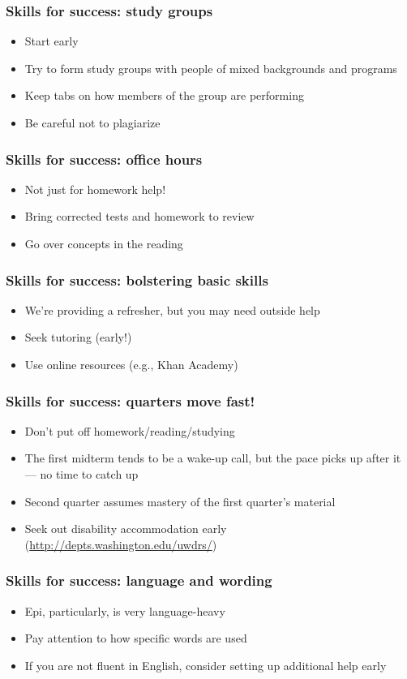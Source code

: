 \documentclass[12pt]{beamer}
\newcommand{\myframe}[1]{\begin{frame} \frametitle{#1}}
\newenvironment{spaceitemize}
{ \begin{itemize}
    \setlength{\itemsep}{10pt}
    \setlength{\parskip}{0pt}
    \setlength{\parsep}{0pt}     }
{ \end{itemize}                  }
\begin{document}
\myframe{Skills for success: study groups}
\begin{spaceitemize}
\item Start early
\item Try to form study groups with people of mixed backgrounds and programs
\item Keep tabs on how members of the group are performing
\item Be careful not to plagiarize
\end{spaceitemize}
\end{frame}

\myframe{Skills for success: office hours}
\begin{spaceitemize}
\item Not just for homework help!
\item Bring corrected tests and homework to review
\item Go over concepts in the reading
\end{spaceitemize}
\end{frame}

\myframe{Skills for success: bolstering basic skills}
\begin{spaceitemize}
\item We're providing a refresher, but you may need outside help
\item Seek tutoring (early!)
\item Use online resources (e.g., Khan Academy)
\end{spaceitemize}
\end{frame}

\myframe{Skills for success: quarters move fast!}
\begin{spaceitemize}
\item Don't put off homework/reading/studying
\item The first midterm tends to be a wake-up call, but the pace picks up after it --- no time to catch up
\item Second quarter assumes mastery of the first quarter's material
\item Seek out disability accommodation early (\url{http://depts.washington.edu/uwdrs/})
\end{spaceitemize}
\end{frame}

\myframe{Skills for success: language and wording}
\begin{spaceitemize}
\item Epi, particularly, is very language-heavy
\item Pay attention to how specific words are used
\item If you are not fluent in English, consider setting up additional help early
\end{spaceitemize}
\end{frame}
\end{document}
